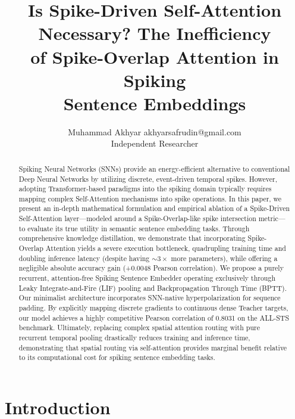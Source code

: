 \documentclass[10pt]{article} %
\title{Is Spike-Driven Self-Attention Necessary? The Inefficiency\\ of Spike-Overlap Attention in Spiking\\ Sentence Embeddings}
\author{\name Muhammad Akhyar \email akhyarsafrudin@gmail.com \\
      \addr Independent Researcher}
\begin{document}
\maketitle

\begin{abstract}
Spiking Neural Networks (SNNs) provide an energy-efficient alternative to conventional Deep Neural Networks by utilizing discrete, event-driven temporal spikes. However, adopting Transformer-based paradigms into the spiking domain typically requires mapping complex Self-Attention mechanisms into spike operations. In this paper, we present an in-depth mathematical formulation and empirical ablation of a Spike-Driven Self-Attention layer—modeled around a Spike-Overlap-like spike intersection metric—to evaluate its true utility in semantic sentence embedding tasks. Through comprehensive knowledge distillation, we demonstrate that incorporating Spike-Overlap Attention yields a severe execution bottleneck, quadrupling training time and doubling inference latency (despite having $\sim 3\times$ more parameters), while offering a negligible absolute accuracy gain (+0.0048 Pearson correlation). We propose a purely recurrent, attention-free Spiking Sentence Embedder operating exclusively through Leaky Integrate-and-Fire (LIF) pooling and Backpropagation Through Time (BPTT). Our minimalist architecture incorporates SNN-native hyperpolarization for sequence padding. By explicitly mapping discrete gradients to continuous dense Teacher targets, our model achieves a highly competitive Pearson correlation of 0.8031 on the ALL-STS benchmark. Ultimately, replacing complex spatial attention routing with pure recurrent temporal pooling drastically reduces training and inference time, demonstrating that spatial routing via self-attention provides marginal benefit relative to its computational cost for spiking sentence embedding tasks.
\end{abstract}

\section{Introduction}
\end{document}
